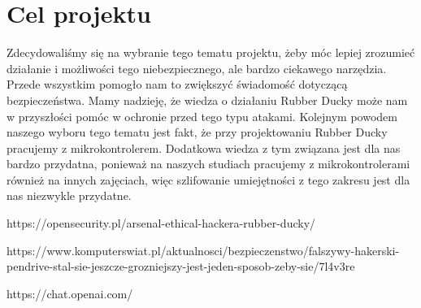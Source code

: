 \documentclass{article}
\begin{document}
\section{Cel projektu}
Zdecydowaliśmy się na wybranie tego tematu projektu, żeby móc lepiej zrozumieć działanie i możliwości tego niebezpiecznego, ale bardzo ciekawego narzędzia. Przede wszystkim pomogło nam to zwiększyć świadomość dotyczącą bezpieczeństwa. Mamy nadzieję, że wiedza o działaniu Rubber Ducky może nam w przyszłości pomóc w ochronie przed tego typu atakami. Kolejnym powodem naszego wyboru tego tematu jest fakt, że przy projektowaniu Rubber Ducky pracujemy z mikrokontrolerem. Dodatkowa wiedza z tym związana jest dla nas bardzo przydatna, ponieważ na naszych studiach pracujemy z mikrokontrolerami również na innych zajęciach, więc szlifowanie umiejętności z tego zakresu jest dla nas niezwykle przydatne.




\begin{thebibliography}{9}

  https://opensecurity.pl/arsenal-ethical-hackera-rubber-ducky/
  
 \bibitem{} https://www.komputerswiat.pl/aktualnosci/bezpieczenstwo/falszywy-hakerski-pendrive-stal-sie-jeszcze-grozniejszy-jest-jeden-sposob-zeby-sie/7l4v3re
  
 \bibitem{} https://chat.openai.com/
  
\end{thebibliography}
\end{document}
